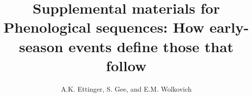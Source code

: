 \documentclass{article}
\begin{document}

\title{Supplemental materials for \\ Phenological sequences: How early-season events define those that follow} 
\author{A.K. Ettinger, S. Gee, and E.M. Wolkovich}
\maketitle  %
\renewcommand{\thetable}{S\arabic{table}}
\renewcommand{\thefigure}{S\arabic{figure}}





%
\end{document}
